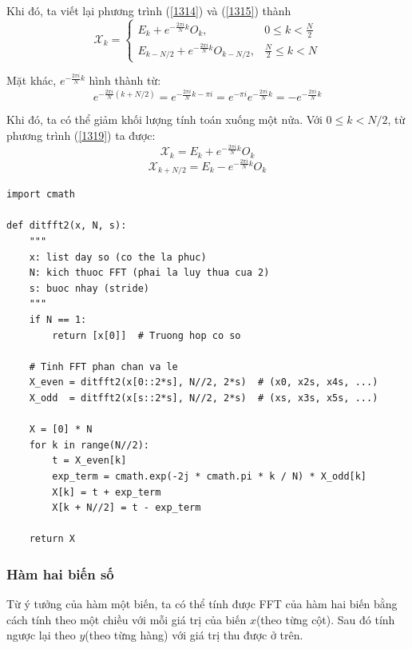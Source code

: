 \documentclass[12pt,a4paper]{report}
\numberwithin{equation}{section}
\theoremstyle{definition} %
\begin{document}
Khi đó, ta viết lại phương trình (\ref{1314}) và (\ref{1315}) thành
\begin{equation}
	\label{1319}
    \mathcal{X}_k = 
    \begin{cases}
        E_k + e^{-\tfrac{2\pi i}{N}k} O_k, & 0 \leq k < \tfrac{N}{2} \\
        E_{k-N/2} + e^{-\tfrac{2\pi i}{N}k} O_{k-N/2}, & \tfrac{N}{2} \leq k < N
    \end{cases}
\end{equation}

Mặt khác, $e^{-\tfrac{2\pi i}{N}k}$ hình thành từ:
\begin{equation*}
    e^{-\tfrac{2\pi i}{N}(k+N/2)} 
    = e^{-\tfrac{2\pi i}{N}k - \pi i} 
    = e^{-\pi i} e^{-\tfrac{2\pi i}{N}k} 
    = -e^{-\tfrac{2\pi i}{N}k}
\end{equation*}

Khi đó, ta có thể giảm khối lượng tính toán xuống một nửa. Với $0 \leq k < N/2$, từ phương trình (\ref{1319}) ta được:
\begin{equation}
    \mathcal{X}_k = E_k + e^{-\tfrac{2\pi i}{N}k} O_k
\end{equation}
\begin{equation}
    \mathcal{X}_{k+N/2} = E_k - e^{-\tfrac{2\pi i}{N}k} O_k
\end{equation}


\begin{lstlisting}[caption={Thuật toán FFT đệ quy dạng ditfft2}, label={code:fft}]
import cmath

def ditfft2(x, N, s):
    """
    x: list day so (co the la phuc)
    N: kich thuoc FFT (phai la luy thua cua 2)
    s: buoc nhay (stride)
    """
    if N == 1:
        return [x[0]]  # Truong hop co so
    
    # Tinh FFT phan chan va le
    X_even = ditfft2(x[0::2*s], N//2, 2*s)  # (x0, x2s, x4s, ...)
    X_odd  = ditfft2(x[s::2*s], N//2, 2*s)  # (xs, x3s, x5s, ...)
    
    X = [0] * N
    for k in range(N//2):
        t = X_even[k]
        exp_term = cmath.exp(-2j * cmath.pi * k / N) * X_odd[k]
        X[k] = t + exp_term
        X[k + N//2] = t - exp_term
    
    return X
\end{lstlisting}
\subsubsection{Hàm hai biến số}
Từ ý tưởng của hàm một biến, ta có thể tính được FFT của hàm hai biến bằng cách tính theo một chiều với mỗi giá trị của biến $x$(theo từng cột). Sau đó tính ngược lại theo $y$(theo từng hàng) với giá trị thu được ở trên.
\end{document}
